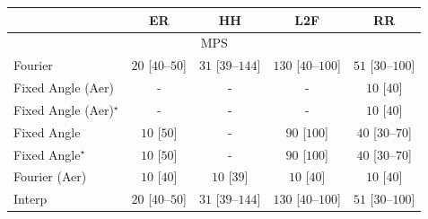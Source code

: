 \begin{tabular}{l|cccc|}
\toprule
            & ER & HH & L2F & RR \\
\midrule
\multicolumn{5}{c}{\rule{0pt}{8pt}MPS} \\
\midrule
Fourier & {\cellcolor[HTML]{F5FBF3}} \color[HTML]{000000} $20$ [$40$--$50$] & {\cellcolor[HTML]{F4FBF1}} \color[HTML]{000000} $31$ [$39$--$144$] & {\cellcolor[HTML]{DFF3DA}} \color[HTML]{000000} $130$ [$40$--$100$] & {\cellcolor[HTML]{F0F9EC}} \color[HTML]{000000} $51$ [$30$--$100$] \\
Fixed Angle (Aer) & {\cellcolor[HTML]{000000}} \color[HTML]{F1F1F1} {\cellcolor{white}} \color{black} - & {\cellcolor[HTML]{000000}} \color[HTML]{F1F1F1} {\cellcolor{white}} \color{black} - & {\cellcolor[HTML]{000000}} \color[HTML]{F1F1F1} {\cellcolor{white}} \color{black} - & {\cellcolor[HTML]{F7FCF5}} \color[HTML]{000000} $10$ [$40$] \\
Fixed Angle (Aer)$^\star$ & {\cellcolor[HTML]{000000}} \color[HTML]{F1F1F1} {\cellcolor{white}} \color{black} - & {\cellcolor[HTML]{000000}} \color[HTML]{F1F1F1} {\cellcolor{white}} \color{black} - & {\cellcolor[HTML]{000000}} \color[HTML]{F1F1F1} {\cellcolor{white}} \color{black} - & {\cellcolor[HTML]{F7FCF5}} \color[HTML]{000000} $10$ [$40$] \\
Fixed Angle & {\cellcolor[HTML]{F7FCF5}} \color[HTML]{000000} $10$ [$50$] & {\cellcolor[HTML]{000000}} \color[HTML]{F1F1F1} {\cellcolor{white}} \color{black} - & {\cellcolor[HTML]{E9F7E5}} \color[HTML]{000000} $90$ [$100$] & {\cellcolor[HTML]{F2FAEF}} \color[HTML]{000000} $40$ [$30$--$70$] \\
Fixed Angle$^\star$ & {\cellcolor[HTML]{F7FCF5}} \color[HTML]{000000} $10$ [$50$] & {\cellcolor[HTML]{000000}} \color[HTML]{F1F1F1} {\cellcolor{white}} \color{black} - & {\cellcolor[HTML]{E9F7E5}} \color[HTML]{000000} $90$ [$100$] & {\cellcolor[HTML]{F2FAEF}} \color[HTML]{000000} $40$ [$30$--$70$] \\
Fourier (Aer) & {\cellcolor[HTML]{F7FCF5}} \color[HTML]{000000} $10$ [$40$] & {\cellcolor[HTML]{F7FCF5}} \color[HTML]{000000} $10$ [$39$] & {\cellcolor[HTML]{F7FCF5}} \color[HTML]{000000} $10$ [$40$] & {\cellcolor[HTML]{F7FCF5}} \color[HTML]{000000} $10$ [$40$] \\
Interp & {\cellcolor[HTML]{F5FBF3}} \color[HTML]{000000} $20$ [$40$--$50$] & {\cellcolor[HTML]{F4FBF1}} \color[HTML]{000000} $31$ [$39$--$144$] & {\cellcolor[HTML]{DFF3DA}} \color[HTML]{000000} $130$ [$40$--$100$] & {\cellcolor[HTML]{F0F9EC}} \color[HTML]{000000} $51$ [$30$--$100$] \\

\end{tabular}
